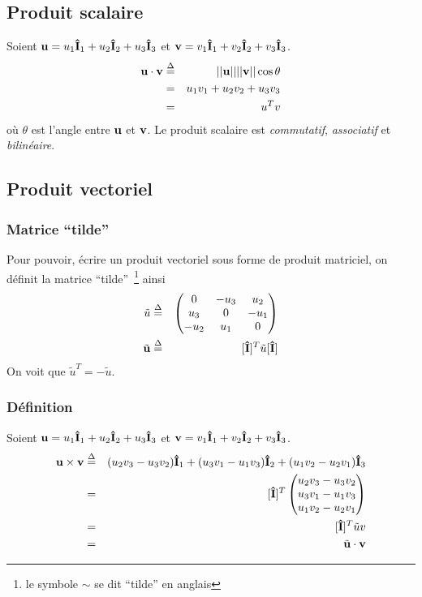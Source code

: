 \documentclass[11pt,a4paper]{article}
\newcommand\fv[1]{{\bf #1}} %
\newcommand\ui{{\bf\hat{I}}} %
\newcommand\eqdef{\stackrel{\Delta}{=}}
\begin{document}
\subsection{Produit scalaire}

Soient $\fv{u} = u_1\ui_1 + u_2\ui_2 + u_3\ui_3$ et $\fv{v} = v_1\ui_1 + v_2\ui_2 + v_3\ui_3$.
\begin{eqnarray*}
	\fv{u}\cdot\fv{v} & \eqdef & ||\fv{u}|| ||\fv{v}|| \cos\theta\\
	& = & u_1v_1 + u_2v_2 + u_3v_3\\
	& = & u^T v
\end{eqnarray*}
où $\theta$ est l'angle entre $\fv{u}$ et $\fv{v}$.
Le produit scalaire est {\em commutatif}, {\em associatif} et {\em bilinéaire}.

\subsection{Produit vectoriel}

\subsubsection{Matrice ``tilde''}
Pour pouvoir, écrire un produit vectoriel sous forme de produit matriciel, on définit la matrice ``tilde''~\footnote{le symbole $\sim$ se dit ``tilde'' en anglais} ainsi
\begin{eqnarray*}
	\tilde{u} & \eqdef & \begin{pmatrix}0 & -u_3 & u_2\\ u_3 & 0 & -u_1\\ -u_2 & u_1 & 0\end{pmatrix}\\
	\tilde{\fv{u}} & \eqdef & [\ui]^T \tilde{u} [\ui]
\end{eqnarray*}
On voit que $\tilde{u}^T = -\tilde{u}$.

\subsubsection{Définition}
Soient $\fv{u} = u_1\ui_1 + u_2\ui_2 + u_3\ui_3$ et $\fv{v} = v_1\ui_1 + v_2\ui_2 + v_3\ui_3$.
\begin{eqnarray*}
	\fv{u}\times\fv{v} & \eqdef & (u_2v_3 - u_3v_2) \ui_1 + (u_3v_1 - u_1v_3) \ui_2 + (u_1v_2 - u_2v_1) \ui_3\\
	& = & [\ui]^T \begin{pmatrix}u_2v_3 - u_3v_2 \\ u_3v_1 - u_1v_3 \\ u_1v_2 - u_2v_1\end{pmatrix}\\
	& = & [\ui]^T \tilde{u}v\\
	& = & \tilde{\fv{u}}\cdot\fv{v}
\end{eqnarray*}
\end{document}
